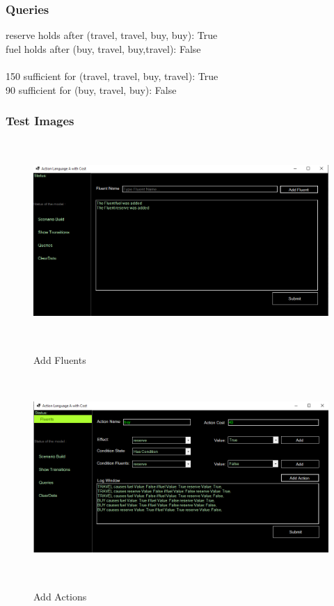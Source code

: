\documentclass[11pt]{article}
\begin{document}
	\subsubsection{Queries}
	reserve holds after (travel, travel, buy, buy): True\\
	fuel holds after (buy, travel, buy,travel): False\\
	\\
	150 sufficient for (travel, travel, buy, travel): True\\
	90 sufficient for (buy, travel, buy): False\\
	\subsubsection*{Test Images}\label{par:501}
	\begin{figure}[H]
		\centering
		\includegraphics[width=6in,height=3in]{./testImages/Example1/img1.png}
		\label{Figure:f01.1}
		\caption{Add Fluents}
	\end{figure}
	\begin{figure}[H]
		\centering
		\includegraphics[width=6in,height=3in]{./testImages/Example1/img2.png}
		\label{Figure:f01.2}
		\caption{Add Actions}
	\end{figure}
\end{document}
